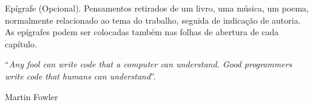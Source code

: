 \begin{epigrafe}
	
	\vspace*{\fill}
	Epígrafe (Opcional). Pensamentos retirados de um livro, uma música, um poema, normalmente relacionado ao tema do trabalho, seguida de indicação de autoria. As epígrafes podem ser colocadas também nas folhas de abertura de cada capítulo.  
    
	\epigraph{``\emph{Any fool can write code that a computer can understand. Good programmers write code that humans can understand}''.}{Martin Fowler}
	
\end{epigrafe}